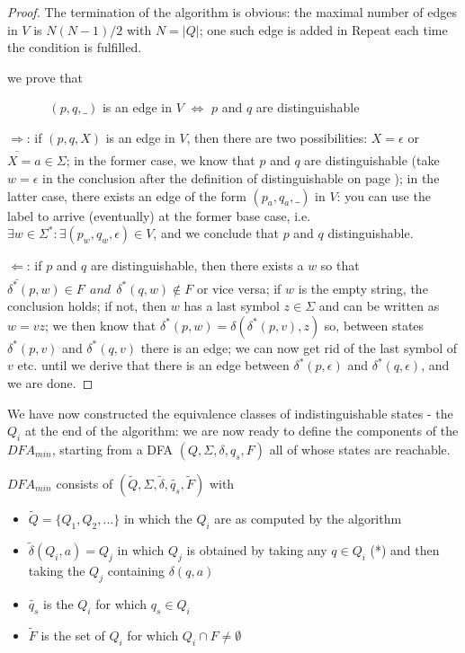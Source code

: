 \begin{proof}
The termination of the algorithm is obvious: the maximal number of
edges in $V$ is $N(N-1)/2$ with $N=|Q|$; one such edge is added in
Repeat each time the condition is fulfilled.

we prove that


$~~~~~~~~~~~~~~~(p,q,\_)$ is an edge in $V$ $\Longleftrightarrow$ $p$ and $q$ are distinguishable


$\underline{\Longrightarrow}$: if $(p,q,X)$ is an edge in $V$, then
there are two possibilities: $X = \epsilon$ or $X = a \in \Sigma$; in
the former case, we know that $p$ and $q$ are distinguishable (take
$w = \epsilon$ in the conclusion after the definition of
distinguishable on page \pageref{gelijk}); in the latter case, there
exists an edge of the form $(p_a,q_a,\_)$ in $V$: you can use the
label to arrive (eventually) at the former base case, i.e.
%
$\exists w \in \Sigma^* : \exists (p_w,q_w,\epsilon) \in V$, and we
conclude that $p$ and $q$ distinguishable.

$\underline{\Longleftarrow}$: if $p$ and $q$ are distinguishable, then
there exists a $w$ so that $\delta^*(p,w) \in F~~and~~\delta^*(q,w)
\notin F$ or vice versa; if $w$ is the empty string, the conclusion
holds; if not, then $w$ has a last symbol $z \in \Sigma$ and can be
written as $w = vz$; we then know that $\delta^*(p,w) =
\delta(\delta^*(p,v),z)$ so, between states $\delta^*(p,v)$ and
$\delta^*(q,v)$ there is an edge; we can now get rid of the last
symbol of $v$ etc. until we derive that there is an edge between
$\delta^*(p,\epsilon)$ and $\delta^*(q,\epsilon)$, and we are done.
\end{proof}

We have now constructed the equivalence classes of indistinguishable
states - the $Q_i$ at the end of the algorithm: we are now ready to
define the components of the $DFA_{min}$, starting from a DFA
$(Q,\Sigma,\delta,q_s,F)$ all of whose states are reachable.

$DFA_{min}$ consists of
$(\tilde{Q},\Sigma,\tilde{\delta},\tilde{q_s},\tilde{F})$
with
\begin{itemize}
\item $\tilde{Q} = \{Q_1, Q_2, ...\}$ in which the $Q_i$ are as
  computed by the algorithm

\item
$\tilde{\delta}(Q_i,a) = Q_j$ in which $Q_j$ is obtained by taking any
  $q \in Q_i$ (*) and then taking the $Q_j$ containing $\delta(q,a)$

\item
$\tilde{q_s}$ is the $Q_i$ for which $q_s \in Q_i$

\item
$\tilde{F}$ is the set of $Q_i$ for which $Q_i \cap F \neq \emptyset$
\end{itemize}

